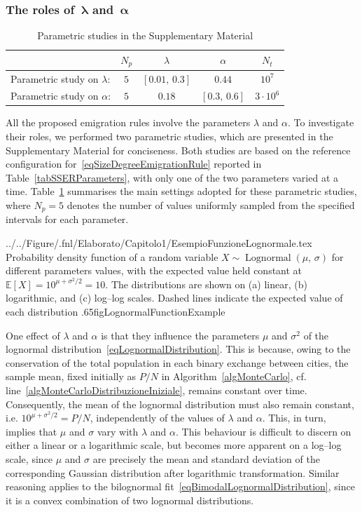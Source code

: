 \documentclass[a4paper]{article}
\begin{document}
\subsubsection{The roles of~\texorpdfstring{$\boldsymbol{\lambda}$}{} and~\texorpdfstring{$\boldsymbol{\alpha}$}{}}
%
\begin{table}[!t]
\centering
\caption{Parametric studies in the Supplementary Material}
\label{tabRETFParametricStudies}
\begin{tabular}{lcccc}
\toprule
& $N_p$ & $\lambda$ & $\alpha$ & $N_t$ \\
\midrule
Parametric study on $\lambda$: & $5$ & $[0.01,\,0.3]$ & $0.44$ & $10^7$ \\
Parametric study on $\alpha$: & $5$ & $0.18$ & $[0.3,\,0.6]$ & $3\cdot 10^6$ \\
\bottomrule
\end{tabular}
\end{table}
                
All the proposed emigration rules involve the parameters $\lambda$ and $\alpha$. To investigate their roles, we performed two parametric studies, which are presented in the Supplementary Material for conciseness. Both studies are based on the reference configuration for~\eqref{eqSizeDegreeEmigrationRule} reported in Table~\ref{tabSSERParameters}, with only one of the two parameters varied at a time. Table~\ref{tabRETFParametricStudies} summarises the main settings adopted for these parametric studies, where $N_p=5$ denotes the number of values uniformly sampled from the specified intervals for each parameter.

  {../../Figure/.fnl/Elaborato/Capitolo1/EsempioFunzioneLognormale.tex}
  {Probability density function of a random variable $X\sim\operatorname{Lognormal}(\mu,\,\sigma)$ for different parameters values, with the expected value held constant at $\mathbb{E}[X]=10^{\mu+\sigma^2/2}=10$. The distributions are shown on (a) linear, (b) logarithmic, and (c) log--log scales. Dashed lines indicate the expected value of each distribution}
  {.65\linewidth}{figLognormalFunctionExample}

One effect of $\lambda$ and $\alpha$ is that they influence the parameters $\mu$ and $\sigma^2$ of the lognormal distribution~\eqref{eqLognormalDistribution}. This is because, owing to the conservation of the total population in each binary exchange between cities, the sample mean, fixed initially as $P/N$ in Algorithm~\ref{algMonteCarlo}, cf. line~\ref{algMonteCarloDistribuzioneIniziale}, remains constant over time. Consequently, the mean of the lognormal distribution must also remain constant, i.e. $10^{\mu+\sigma^2/2}=P/N$, independently of the values of $\lambda$ and $\alpha$. This, in turn, implies that $\mu$ and $\sigma$ vary with $\lambda$ and $\alpha$. This behaviour is difficult to discern on either a linear or a logarithmic scale, but becomes more apparent on a log--log scale, since $\mu$ and $\sigma$ are precisely the mean and standard deviation of the corresponding Gaussian distribution after logarithmic transformation. Similar reasoning applies to the bilognormal fit~\eqref{eqBimodalLognormalDistribution}, since it is a convex combination of two lognormal distributions.
\end{document}
